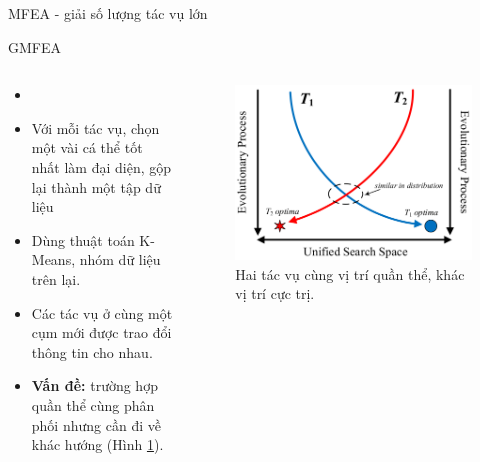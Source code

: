 \begin{frame}{MFEA - giải số lượng tác vụ lớn}
    \begin{block}{GMFEA}
        \begin{columns}
            \begin{column}{0.64\textwidth}
                \begin{itemize}
                    \item {}
                    \item Với mỗi tác vụ, chọn một vài cá thể tốt nhất làm đại diện, gộp lại thành một tập dữ liệu
                    \item Dùng thuật toán K-Means, nhóm dữ liệu trên lại.
                    \item Các tác vụ ở cùng một cụm mới được trao đổi thông tin cho nhau.
                    \item \textbf{Vấn đề:} trường hợp quần thể cùng phân phối nhưng cần đi về khác hướng (Hình \ref{fig:related:similar-distribution}).
                \end{itemize}
            \end{column}
            \begin{column}{0.34\textwidth}
                \begin{figure}
                    \centering
                    \includegraphics[width=\linewidth]{figure/related/similar_distribution.png}
                    \caption{\fontsize{8pt}{10}\selectfont Hai tác vụ cùng vị trí quần thể, khác vị trí cực trị.}
                    \label{fig:related:similar-distribution}
                \end{figure}
            \end{column}
        \end{columns}
    \end{block}
\end{frame}

